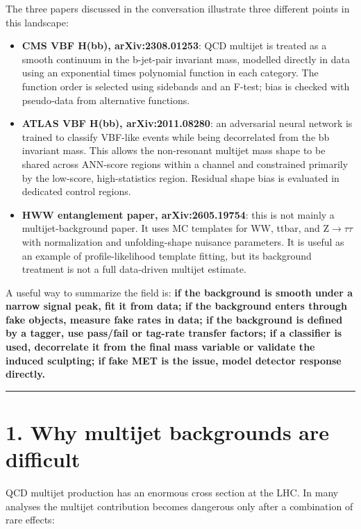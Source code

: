 \documentclass[11pt]{article}
\begin{document}
The three papers discussed in the conversation illustrate three different points in this landscape:

\begin{itemize}
\item \textbf{CMS VBF H(bb), arXiv:2308.01253}: QCD multijet is treated as a smooth continuum in the b-jet-pair invariant mass, modelled directly in data using an exponential times polynomial function in each category. The function order is selected using sidebands and an F-test; bias is checked with pseudo-data from alternative functions.
\item \textbf{ATLAS VBF H(bb), arXiv:2011.08280}: an adversarial neural network is trained to classify VBF-like events while being decorrelated from the bb invariant mass. This allows the non-resonant multijet mass shape to be shared across ANN-score regions within a channel and constrained primarily by the low-score, high-statistics region. Residual shape bias is evaluated in dedicated control regions.
\item \textbf{HWW entanglement paper, arXiv:2605.19754}: this is not mainly a multijet-background paper. It uses MC templates for WW, ttbar, and Z$\to$$\tau$$\tau$ with normalization and unfolding-shape nuisance parameters. It is useful as an example of profile-likelihood template fitting, but its background treatment is not a full data-driven multijet estimate.
\end{itemize}

A useful way to summarize the field is: \textbf{if the background is smooth under a narrow signal peak, fit it from data; if the background enters through fake objects, measure fake rates in data; if the background is defined by a tagger, use pass/fail or tag-rate transfer factors; if a classifier is used, decorrelate it from the final mass variable or validate the induced sculpting; if fake MET is the issue, model detector response directly.}

\bigskip\hrule\bigskip

\section{1. Why multijet backgrounds are difficult}

QCD multijet production has an enormous cross section at the LHC. In many analyses the multijet contribution becomes dangerous only after a combination of rare effects:
\end{document}
